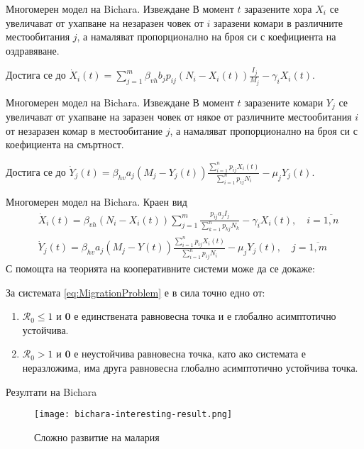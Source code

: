 \begin{frame}[t]{Многомерен модел на Bichara. Извеждане}
  В момент $t$ заразените хора $X_i$ се увеличават от ухапване на незаразен човек от $i$ заразени комари в различните местообитания $j$, а намаляват пропорционално на броя си с коефициента на оздравяване.
  
  Достига се до $\dot{X}_i(t) = \sum_{j=1}^{m} \beta_{vh} b_j p_{ij} (N_i - X_i(t)) \frac{I_j}{M_j} - \gamma_i X_i(t)$.
\end{frame}

\begin{frame}[t]{Многомерен модел на Bichara. Извеждане}
  В момент $t$ заразените комари $Y_j$ се увеличават от ухапване на заразен човек от някое от различните местообитания $i$ от незаразен комар в местообитание $j$, а намаляват пропорционално на броя си с коефициента на смъртност.
  
  Достига се до $\dot{Y}_j(t) = \beta_{hv} a_j (M_j - Y_j(t)) \frac{\sum_{i=1}^n p_{ij} X_i(t)}{\sum_{i=1}^n p_{ij} N_i} - \mu_j Y_j(t)$.
\end{frame}

\begin{frame}[t]{Многомерен модел на Bichara. Краен вид}
  \begin{equation}
    \label{eq:MigrationProblem}
    \begin{split}
      &\dot{X}_i(t) = \beta_{vh} (N_i - X_i(t)) \sum_{j=1}^{m} \frac{p_{ij} a_j I_j}{\sum_{k=1}^n p_{kj} N_k} - \gamma_i X_i(t), \quad i=\overline{1, n} \\
      &\dot{Y}_j(t) = \beta_{hv} a_j (M_j - Y(t)) \frac{\sum_{i=1}^n p_{ij} X_i(t)}{\sum_{i=1}^n p_{ij} N_i} - \mu_j Y_j(t), \quad j=\overline{1, m}
    \end{split}
  \end{equation}
  С помощта на теорията на кооперативните системи може да се докаже:
  \begin{proposition}
    За системата \ref{eq:MigrationProblem} е в сила точно едно от:
    \begin{enumerate}
      \item $\mathscr{R}_0 \leq 1$ и $\boldsymbol{0}$ е единствената равновесна точка и е глобално асимптотично устойчива.
      \item $\mathscr{R}_0 > 1$ и $\boldsymbol{0}$ е неустойчива равновесна точка, като ако системата е неразложима, има друга равновесна глобално асимптотично устойчива точка.
    \end{enumerate}
  \end{proposition}
\end{frame}

\begin{frame}[t]{Резултати на Bichara}
  \begin{figure}[h]
    \centering
    \texttt{[image: bichara-interesting-result.png]}
    \caption{Сложно развитие на малария}
  \end{figure}
\end{frame}

